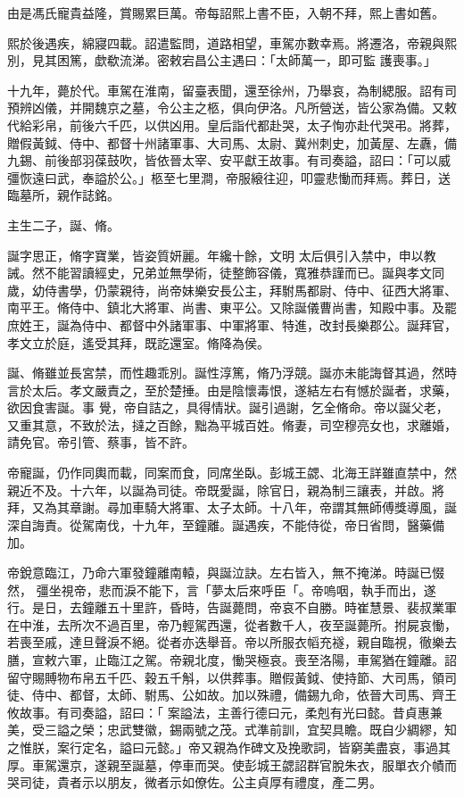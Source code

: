 \begin{pinyinscope}
 由是馮氏寵貴益隆，賞賜累巨萬。帝每詔熙上書不臣，入朝不拜，熙上書如舊。



 熙於後遇疾，綿寢四載。詔遣監問，道路相望，車駕亦數幸焉。將遷洛，帝親與熙別，見其困篤，歔欷流涕。密敕宕昌公主遇曰：「太師萬一，即可監
 護喪事。」



 十九年，薨於代。車駕在淮南，留臺表聞，還至徐州，乃舉哀，為制緦服。詔有司預辨凶儀，并開魏京之墓，令公主之柩，俱向伊洛。凡所營送，皆公家為備。又敕代給彩帛，前後六千匹，以供凶用。皇后詣代都赴哭，太子恂亦赴代哭弔。將葬，贈假黃鉞、侍中、都督十州諸軍事、大司馬、太尉、冀州刺史，加黃屋、左纛，備九錫、前後部羽葆鼓吹，皆依晉太宰、安平獻王故事。有司奏謚，詔曰：「可以威彊恢遠曰武，奉謚於公。」柩至七里澗，帝服縗往迎，叩靈悲慟而拜焉。葬日，送臨墓所，親作誌銘。



 主生二子，誕、脩。



 誕字思正，脩字寶業，皆姿質妍麗。年纔十餘，文明
 太后俱引入禁中，申以教誡。然不能習讀經史，兄弟並無學術，徒整飾容儀，寬雅恭謹而已。誕與孝文同歲，幼侍書學，仍蒙親待，尚帝妹樂安長公主，拜駙馬都尉、侍中、征西大將軍、南平王。脩侍中、鎮北大將軍、尚書、東平公。又除誕儀曹尚書，知殿中事。及罷庶姓王，誕為侍中、都督中外諸軍事、中軍將軍、特進，改封長樂郡公。誕拜官，孝文立於庭，遙受其拜，既訖還室。脩降為侯。



 誕、脩雖並長宮禁，而性趣乖別。誕性淳篤，脩乃浮競。誕亦未能誨督其過，然時言於太后。孝文嚴責之，至於楚捶。由是陰懷毒恨，遂結左右有憾於誕者，求藥，欲因食害誕。事
 覺，帝自詰之，具得情狀。誕引過謝，乞全脩命。帝以誕父老，又重其意，不致於法，撻之百餘，黜為平城百姓。脩妻，司空穆亮女也，求離婚，請免官。帝引管、蔡事，皆不許。



 帝寵誕，仍作同輿而載，同案而食，同席坐臥。彭城王勰、北海王詳雖直禁中，然親近不及。十六年，以誕為司徒。帝既愛誕，除官日，親為制三讓表，并啟。將拜，又為其章謝。尋加車騎大將軍、太子太師。十八年，帝謂其無師傅獎導風，誕深自誨責。從駕南伐，十九年，至鐘離。誕遇疾，不能侍從，帝日省問，醫藥備加。



 帝銳意臨江，乃命六軍發鐘離南轅，與誕泣訣。左右皆入，無不掩涕。時誕已惙然，
 彊坐視帝，悲而淚不能下，言「夢太后來呼臣「。帝嗚咽，執手而出，遂行。是日，去鐘離五十里許，昏時，告誕薨問，帝哀不自勝。時崔慧景、裴叔業軍在中淮，去所次不過百里，帝乃輕駕西還，從者數千人，夜至誕薨所。拊屍哀慟，若喪至戚，達旦聲淚不絕。從者亦迭舉音。帝以所服衣幍充襚，親自臨視，徹樂去膳，宣敕六軍，止臨江之駕。帝親北度，慟哭極哀。喪至洛陽，車駕猶在鐘離。詔留守賜賻物布帛五千匹、穀五千斛，以供葬事。贈假黃鉞、使持節、大司馬，領司徒、侍中、都督，太師、駙馬、公如故。加以殊禮，備錫九命，依晉大司馬、齊王攸故事。有司奏謚，詔曰：「
 案謚法，主善行德曰元，柔剋有光曰懿。昔貞惠兼美，受三謚之榮；忠武雙徽，錫兩號之茂。式準前訓，宜契具瞻。既自少綢繆，知之惟朕，案行定名，謚曰元懿。」帝又親為作碑文及挽歌詞，皆窮美盡哀，事過其厚。車駕還京，遂親至誕墓，停車而哭。使彭城王勰詔群官脫朱衣，服單衣介幘而哭司徒，貴者示以朋友，微者示如僚佐。公主貞厚有禮度，產二男。




\end{pinyinscope}

